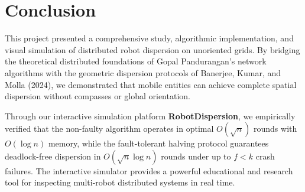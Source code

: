 \documentclass[11pt,a4paper]{report}
\begin{document}
\section{Conclusion}
This project presented a comprehensive study, algorithmic implementation, and visual simulation of distributed robot dispersion on unoriented grids. By bridging the theoretical distributed foundations of Gopal Pandurangan's network algorithms with the geometric dispersion protocols of Banerjee, Kumar, and Molla (2024), we demonstrated that mobile entities can achieve complete spatial dispersion without compasses or global orientation.

Through our interactive simulation platform \textbf{RobotDispersion}, we empirically verified that the non-faulty algorithm operates in optimal $O(\sqrt{n})$ rounds with $O(\log n)$ memory, while the fault-tolerant halving protocol guarantees deadlock-free dispersion in $O(\sqrt{n} \log n)$ rounds under up to $f < k$ crash failures. The interactive simulator provides a powerful educational and research tool for inspecting multi-robot distributed systems in real time.



\end{document}
